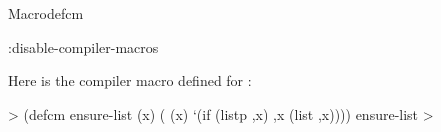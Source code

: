 \documentclass[10pt,twoside,english,pdftex]{article}
\begin{document}
\begin{functiondoc}{Macro}{defcm}{
    }
\begin{alsos}{:disable-compiler-macros}
\end{alsos}

\fnexample
%
%
%
%
Here is the compiler macro defined for :
%
\W\supp
\begin{example}
  > (defcm ensure-list (x)
      ( (x)
        `(if (listp ,x) ,x (list ,x))))
  ensure-list
  >
\end{example}

\end{functiondoc}

\end{document}
